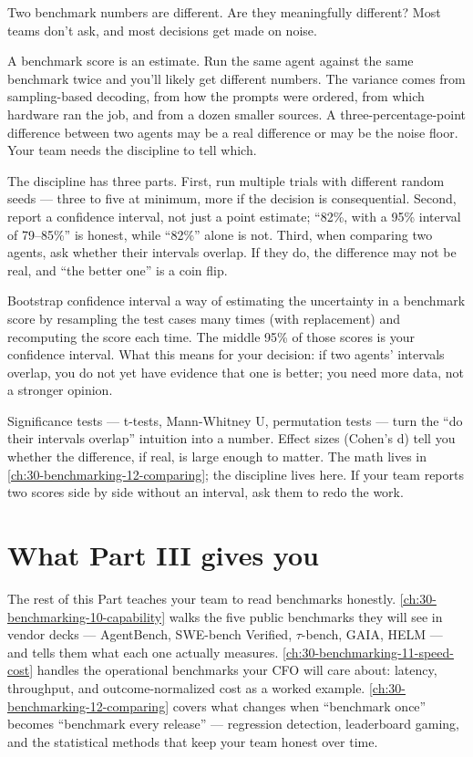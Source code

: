 Two benchmark numbers are different. Are they meaningfully different? Most teams don't ask, and most decisions get made on noise.

A benchmark score is an estimate. Run the same agent against the same benchmark twice and you'll likely get different numbers. The variance comes from sampling-based decoding, from how the prompts were ordered, from which hardware ran the job, and from a dozen smaller sources. A three-percentage-point difference between two agents may be a real difference or may be the noise floor. Your team needs the discipline to tell which.

The discipline has three parts. First, run multiple trials with different random seeds --- three to five at minimum, more if the decision is consequential. Second, report a confidence interval, not just a point estimate; ``82\%, with a 95\% interval of 79--85\%'' is honest, while ``82\%'' alone is not. Third, when comparing two agents, ask whether their intervals overlap. If they do, the difference may not be real, and ``the better one'' is a coin flip.

\begin{TNdefinition}{Bootstrap confidence interval} a way of estimating the uncertainty in a benchmark score by resampling the test cases many times (with replacement) and recomputing the score each time. The middle 95\% of those scores is your confidence interval. What this means for your decision: if two agents' intervals overlap, you do not yet have evidence that one is better; you need more data, not a stronger opinion. \end{TNdefinition}

Significance tests --- t-tests, Mann-Whitney U, permutation tests --- turn the ``do their intervals overlap'' intuition into a number. Effect sizes (Cohen's d) tell you whether the difference, if real, is large enough to matter. The math lives in \autoref{ch:30-benchmarking-12-comparing}; the discipline lives here. If your team reports two scores side by side without an interval, ask them to redo the work.

\section{What Part III gives you}

The rest of this Part teaches your team to read benchmarks honestly. \autoref{ch:30-benchmarking-10-capability} walks the five public benchmarks they will see in vendor decks --- AgentBench, SWE-bench Verified, $\tau$-bench, GAIA, HELM --- and tells them what each one actually measures. \autoref{ch:30-benchmarking-11-speed-cost} handles the operational benchmarks your CFO will care about: latency, throughput, and outcome-normalized cost as a worked example. \autoref{ch:30-benchmarking-12-comparing} covers what changes when ``benchmark once'' becomes ``benchmark every release'' --- regression detection, leaderboard gaming, and the statistical methods that keep your team honest over time.

